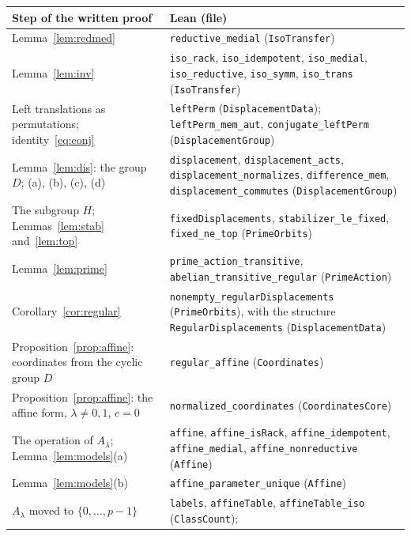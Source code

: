\documentclass[11pt]{article}
\theoremstyle{definition}
\theoremstyle{remark}
\begin{document}
{\begin{table}[ht]
\centering\footnotesize
\renewcommand{\arraystretch}{1.05}
\begin{tabular}{@{}>{\raggedright\arraybackslash}p{}>{\raggedright\arraybackslash}p{}@{}}
\hline
Step of the written proof & Lean (file) \\
\hline
Lemma~\ref{lem:redmed} & \texttt{reductive\_medial} (\texttt{IsoTransfer}) \\
Lemma~\ref{lem:inv} & \texttt{iso\_rack}, \texttt{iso\_idempotent},
\texttt{iso\_medial}, \texttt{iso\_reductive}, \texttt{iso\_symm},
\texttt{iso\_trans} (\texttt{IsoTransfer}) \\
Left translations as permutations; identity~\eqref{eq:conj} &
\texttt{leftPerm} (\texttt{DisplacementData}); \texttt{leftPerm\_mem\_aut},
\texttt{conjugate\_leftPerm} (\texttt{DisplacementGroup}) \\
Lemma~\ref{lem:dis}: the group $D$; (a), (b), (c), (d) &
\texttt{displacement}, \texttt{displacement\_acts},
\texttt{displacement\_normalizes}, \texttt{difference\_mem},
\texttt{displacement\_commutes} (\texttt{DisplacementGroup}) \\
The subgroup $H$; Lemmas~\ref{lem:stab} and~\ref{lem:top} &
\texttt{fixedDisplacements}, \texttt{stabilizer\_le\_fixed},
\texttt{fixed\_ne\_top} (\texttt{PrimeOrbits}) \\
Lemma~\ref{lem:prime} & \texttt{prime\_action\_transitive},
\texttt{abelian\_transitive\_regular} (\texttt{PrimeAction}) \\
Corollary~\ref{cor:regular} & \texttt{nonempty\_regularDisplacements}
(\texttt{PrimeOrbits}), with the structure \texttt{RegularDisplacements}
(\texttt{DisplacementData}) \\
Proposition~\ref{prop:affine}: coordinates from the cyclic group $D$ &
\texttt{regular\_affine} (\texttt{Coordinates}) \\
Proposition~\ref{prop:affine}: the affine form, $\lambda\ne0,1$, $c=0$ &
\texttt{normalized\_coordinates} (\texttt{CoordinatesCore}) \\
The operation of $A_\lambda$; Lemma~\ref{lem:models}(a) & \texttt{affine},
\texttt{affine\_isRack}, \texttt{affine\_idempotent},
\texttt{affine\_medial}, \texttt{affine\_nonreductive} (\texttt{Affine}) \\
Lemma~\ref{lem:models}(b) & \texttt{affine\_parameter\_unique}
(\texttt{Affine}) \\
$A_\lambda$ moved to $\{0,\dots,p-1\}$ & \texttt{labels},
\texttt{affineTable}, \texttt{affineTable\_iso} (\texttt{ClassCount});

\end{tabular}
\end{table}}
\end{document}
